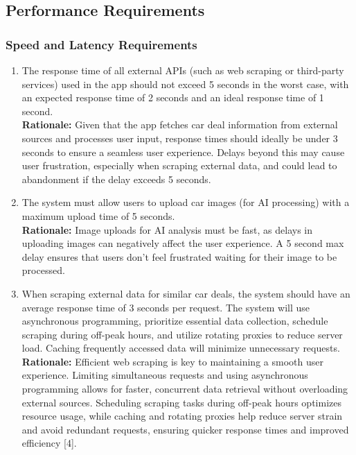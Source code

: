 \documentclass[]{article}
\begin{document}

\subsection{Performance Requirements}
\label{sub:performance_requirements}

\subsubsection{Speed and Latency Requirements}
\label{ssub:speed_and_latency_requirements}
\begin{enumerate}[{PR-SL}1.]
    \item The response time of all external APIs (such as web scraping or third-party services) used in the app should not exceed 5 seconds in the worst case, with an expected response time of 2 seconds and an ideal response time of 1 second.  \\
    \textbf{Rationale:} Given that the app fetches car deal information from external sources and processes user input, response times should ideally be under 3 seconds to ensure a seamless user experience. Delays beyond this may cause user frustration, especially when scraping external data, and could lead to abandonment if the delay exceeds 5 seconds.

    \item The system must allow users to upload car images (for AI processing) with a maximum upload time of 5 seconds.  \\
    \textbf{Rationale:} Image uploads for AI analysis must be fast, as delays in uploading images can negatively affect the user experience. A 5 second max delay ensures that users don't feel frustrated waiting for their image to be processed.

    \item When scraping external data for similar car deals, the system should have an average response time of 3 seconds per request. The system will use asynchronous programming, prioritize essential data collection, schedule scraping during off-peak hours, and utilize rotating proxies to reduce server load. Caching frequently accessed data will minimize unnecessary requests.  \\
    \textbf{Rationale:} Efficient web scraping is key to maintaining a smooth user experience. Limiting simultaneous requests and using asynchronous programming allows for faster, concurrent data retrieval without overloading external sources. Scheduling scraping tasks during off-peak hours optimizes resource usage, while caching and rotating proxies help reduce server strain and avoid redundant requests, ensuring quicker response times and improved efficiency [4].
\end{enumerate}
\end{document}
